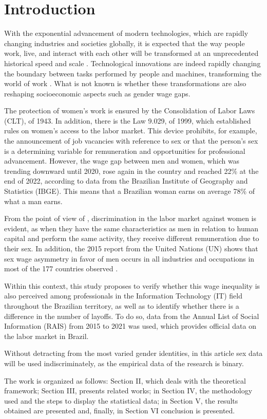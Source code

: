\section{Introduction}

With the exponential advancement of modern technologies, which are rapidly changing industries and societies globally, it is expected that the way people work, live, and interact with each other will be transformed at an unprecedented historical speed and scale \cite{hand1981artificial}. Technological innovations are indeed rapidly changing the boundary between tasks performed by people and machines, transforming the world of work \cite{aksoy2021robots}. What is not known is whether these transformations are also reshaping socioeconomic aspects such as gender wage gaps.

The protection of women’s work is ensured by the Consolidation of Labor Laws (CLT), of 1943. In addition, there is the Law 9.029, of 1999, which established rules on women’s access to the labor market. This device prohibits, for example, the announcement of job vacancies with reference to sex or that the person’s sex is a determining variable for remuneration and opportunities for professional advancement. However, the wage gap between men and women, which was trending downward until 2020, rose again in the country and reached 22\% at the end of 2022, according to data from the Brazilian Institute of Geography and Statistics (IBGE). This means that a Brazilian woman earns on average 78\% of what a man earns.

From the point of view of \cite{ahmed2015human}, discrimination in the labor market against women is evident, as when they have the same characteristics as men in relation to human capital and perform the same activity, they receive different remuneration due to their sex. In addition, the 2015 report from the United Nations (UN) shows that sex wage asymmetry in favor of men occurs in all industries and occupations in most of the 177 countries observed \cite{report2015onu}.

Within this context, this study proposes to verify whether this wage inequality is also perceived among professionals in the Information Technology (IT) field throughout the Brazilian territory, as well as to identify whether there is a difference in the number of layoffs. To do so, data from the Annual List of Social Information (RAIS) from 2015 to 2021 was used, which provides official data on the labor market in Brazil. 

Without detracting from the most varied gender identities, in this article sex data will be used indiscriminately, as the empirical data of the research is binary.

The work is organized as follows: Section II, which deals with the theoretical framework; Section III, presents related works; in Section IV, the methodology used and the steps to display the statistical data; in Section V, the results obtained are presented and, finally, in Section VI conclusion is presented.